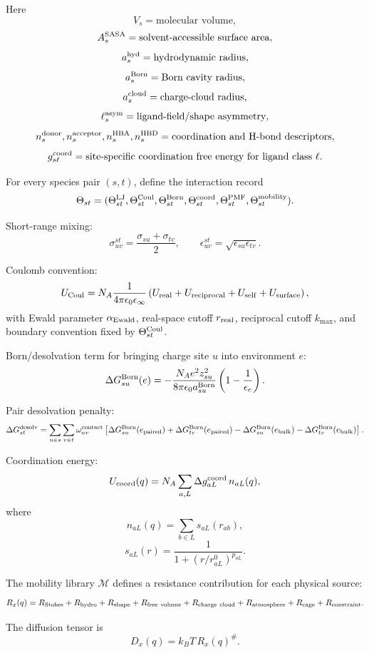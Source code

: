 Here
\[
V_s=\text{molecular volume},
\]
\[
A_s^{\rm SASA}=\text{solvent-accessible surface area},
\]
\[
a_s^{\rm hyd}=\text{hydrodynamic radius},
\]
\[
a_s^{\rm Born}=\text{Born cavity radius},
\]
\[
a_s^{\rm cloud}=\text{charge-cloud radius},
\]
\[
\ell_s^{\rm asym}=\text{ligand-field/shape asymmetry},
\]
\[
n_s^{\rm donor},n_s^{\rm acceptor},n_s^{\rm HBA},n_s^{\rm HBD}
=\text{coordination and H-bond descriptors},
\]
\[
g_{s\ell}^{\rm coord}
=\text{site-specific coordination free energy for ligand class }\ell.
\]

For every species pair \((s,t)\), define the interaction record
\[
\Theta_{st}
=
(
\Theta_{st}^{\rm LJ},
\Theta_{st}^{\rm Coul},
\Theta_{st}^{\rm Born},
\Theta_{st}^{\rm coord},
\Theta_{st}^{\rm PMF},
\Theta_{st}^{\rm mobility}
).
\]

Short-range mixing:
\[
\sigma_{uv}^{st}
=
\frac{\sigma_{su}+\sigma_{tv}}{2},
\qquad
\epsilon_{uv}^{st}
=
\sqrt{\epsilon_{su}\epsilon_{tv}}.
\]

Coulomb convention:
\[
U_{\rm Coul}
=
N_A
\frac{1}{4\pi\epsilon_0\epsilon_\infty}
\left(
U_{\rm real}+U_{\rm reciprocal}+U_{\rm self}+U_{\rm surface}
\right),
\]
with Ewald parameter \(\alpha_{\rm Ewald}\), real-space cutoff \(r_{\rm real}\),
reciprocal cutoff \(k_{\max}\), and boundary convention fixed by \(\Theta_{st}^{\rm Coul}\).

Born/desolvation term for bringing charge site \(u\) into environment \(e\):
\[
\Delta G_{su}^{\rm Born}(e)
=
-\frac{N_A e^2 z_{su}^2}{8\pi\epsilon_0 a_{su}^{\rm Born}}
\left(
1-\frac{1}{\epsilon_e}
\right).
\]

Pair desolvation penalty:
\[
\Delta G_{st}^{\rm desolv}
=
\sum_{u\in s}\sum_{v\in t}
\omega_{uv}^{\rm contact}
\left[
\Delta G_{su}^{\rm Born}(e_{\rm paired})
+
\Delta G_{tv}^{\rm Born}(e_{\rm paired})
-
\Delta G_{su}^{\rm Born}(e_{\rm bulk})
-
\Delta G_{tv}^{\rm Born}(e_{\rm bulk})
\right].
\]

Coordination energy:
\[
U_{\rm coord}(q)
=
N_A
\sum_{a,L}
\Delta g_{aL}^{\rm coord}\,
n_{aL}(q),
\]
where
\[
n_{aL}(q)=\sum_{b\in L}s_{aL}(r_{ab}),
\]
\[
s_{aL}(r)=\frac{1}{1+(r/r_{aL}^{0})^{p_{aL}}}.
\]

The mobility library \(\mathcal M\) defines a resistance contribution for each physical source:
\[
R_x(q)
=
R_{\rm Stokes}
+
R_{\rm hydro}
+
R_{\rm shape}
+
R_{\rm free\ volume}
+
R_{\rm charge\ cloud}
+
R_{\rm atmosphere}
+
R_{\rm cage}
+
R_{\rm constraint}.
\]

The diffusion tensor is
\[
D_x(q)=k_BT\,R_x(q)^\#.
\]


